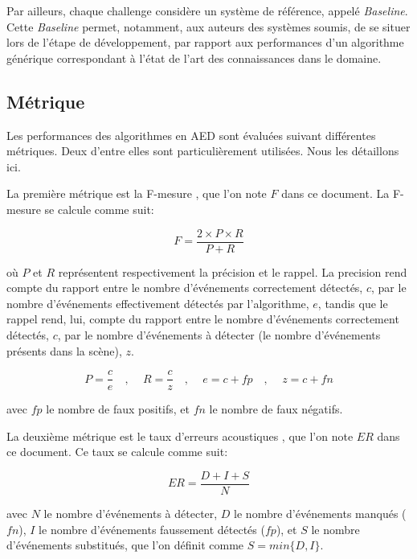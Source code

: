 Par ailleurs, chaque challenge considère un système de référence, appelé \emph{Baseline}. Cette \emph{Baseline} permet, notamment, aux auteurs des systèmes soumis, de se situer lors de l'étape de développement, par rapport aux performances d'un algorithme générique correspondant à l'état de l'art des connaissances dans le domaine.

\subsection{Métrique}
\label{sec:ch6_metriqueAED}

Les performances des algorithmes en AED sont évaluées suivant différentes métriques. Deux d'entre elles sont particulièrement utilisées. Nous les détaillons ici.

La première métrique est la F-mesure \citep{Giannoulis2013database,giannoulis2013detection,Stowell15}, que l'on note $F$ dans ce document. La F-mesure se calcule comme suit:

\begin{equation}
F=\dfrac{2\times P \times R}{P+R}
\end{equation}

où $P$ et $R$ représentent respectivement la précision et le rappel. La precision rend compte du rapport entre le nombre d'événements correctement détectés, $c$, par le nombre d'événements effectivement détectés par l'algorithme, $e$, tandis que le rappel rend, lui, compte du rapport entre le nombre d'événements correctement détectés, $c$, par le nombre d'événements à détecter (le nombre d'événements présents dans la scène), $z$.

\begin{equation}
P=\dfrac{c}{e}  \quad \textrm{, } \quad R=\dfrac{c}{z} \quad \textrm{, } \quad  e=c+fp \quad \textrm{, } \quad  z=c+fn
\end{equation}

avec $fp$ le nombre de faux positifs, et $fn$ le nombre de faux négatifs.

La deuxième métrique est le taux d'erreurs acoustiques \citep{poliner2007discriminative,clear}, que l'on note $ER$ dans ce document. Ce taux se calcule comme suit:

\begin{equation}
ER=\dfrac{D+I+S}{N}
\end{equation}

avec $N$ le nombre d'événements à détecter, $D$ le nombre d'événements manqués ($fn$), $I$ le nombre d'événements faussement détectés ($fp$), et $S$ le nombre d'événements substitués, que l'on définit comme $S=min\lbrace D,I\rbrace$.

